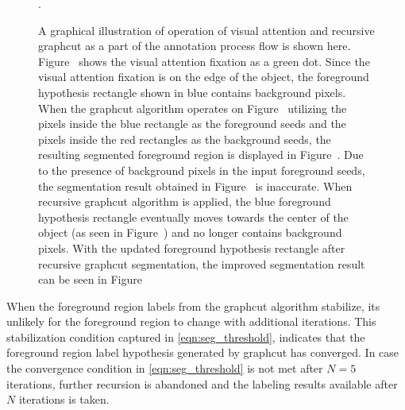 \documentclass {udthesis}
\begin{document}
\begin{figure}
\begin{subfigure}[]{0.2\textwidth}
      \caption{}
      \label{fig:good_seg_recursive_seg}
  \end{subfigure}
\caption[Illustration of annotation process flow]{A graphical illustration of operation of visual attention and recursive graphcut as a part of the annotation process flow is shown here. Figure~ shows the visual attention fixation as a green dot. Since the visual attention fixation is on the edge of the object, the foreground hypothesis rectangle shown in blue contains background pixels. When the graphcut algorithm operates on Figure~ utilizing the pixels inside the blue rectangle as the foreground seeds and the pixels inside the red rectangles as the background seeds, the resulting segmented foreground region is displayed in Figure~. Due to the presence of background pixels in the input foreground seeds, the segmentation result obtained in Figure~ is inaccurate. When recursive graphcut algorithm is 
applied, the blue foreground hypothesis rectangle eventually moves towards the center of the object (as seen in Figure~) and no longer contains background pixels. With the updated foreground hypothesis rectangle after recursive graphcut segmentation, the improved segmentation result can be seen in Figure~}.
\label{fig:annotation_good_seg}
\end{figure}	
%
When the foreground region labels from the graphcut algorithm stabilize, its unlikely for the foreground region to change with additional iterations. This stabilization condition captured in \eqref{eqn:seg_threshold}, indicates that the foreground region label hypothesis generated by graphcut has converged. In case the convergence condition in \eqref{eqn:seg_threshold} is not met after $N=5$ iterations, further recursion is abandoned and the labeling results available after $N$ iterations is taken.
\end{document}

